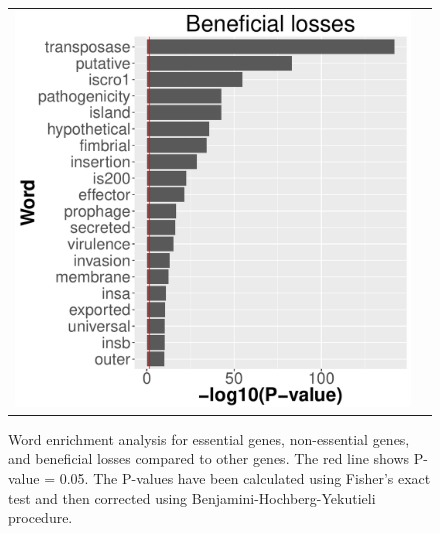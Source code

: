 \documentclass[12pt,letterpaper]{article}
\begin{document}
\begin{figure}
\begin{tabular}{c c}
\includegraphics[scale=0.4]{beneficialloss-pval.pdf}&
\end{tabular}
\caption{Word enrichment analysis for essential genes, non-essential genes, and beneficial losses compared to other genes. The red line shows P-value = 0.05. The P-values have been calculated using Fisher's exact test and then corrected using Benjamini-Hochberg-Yekutieli procedure.}
\label{fig:essentiality-pval}
\end{figure}
\end{document}
